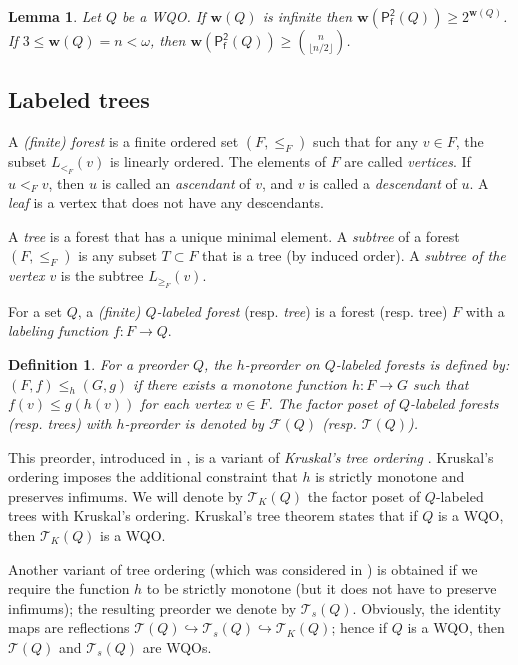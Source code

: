 \documentclass[runningheads]{llncs}
\let \leq \leqslant
\let \geq \geqslant
\let \embeds \hookrightarrow
\renewcommand \S [1][]{\mathsf{P_f^{#1}}}
\def \T {\mathcal{T}}
\def \F {\mathcal{F}}
\def \w {\textbf{w}}
\newtheorem{lemma}{Lemma}
\newtheorem{definition}{Definition}
\begin{document}
\begin{lemma}\label{w(S2)}
    Let $Q$ be a WQO. If $\w(Q)$ is infinite then $\w(\S[2](Q)) \geq 2^{\w(Q)}$. If $3 \leq \w(Q) = n < \omega$, then $\w(\S[2](Q)) \geq \binom{n}{\lfloor n/2 \rfloor}$.
\end{lemma}

\subsection{Labeled trees}\label{trees}

A \textit{(finite) forest} is a finite ordered set $(F, \leq_F)$ such that for any $v \in F$, the subset $L_{<_F}(v)$ is linearly ordered. The elements of $F$ are called \textit{vertices}. If $u <_F v$, then $u$ is called an \textit{ascendant} of $v$, and $v$ is called a \textit{descendant} of $u$. A \textit{leaf} is a vertex that does not have any descendants.

A \textit{tree} is a forest that has a unique minimal element. A \textit{subtree} of a forest $(F, \leq_F)$ is any subset $T \subset F$ that is a tree (by induced order). A \textit{subtree of the vertex $v$} is the subtree $L_{\geq_F}(v)$.

For a set $Q$, a \textit{(finite) $Q$-labeled forest} (resp. \textit{tree}) is a forest (resp. tree) $F$ with a \textit{labeling function} $f \colon F \to Q$.

\begin{definition}
    For a preorder $Q$, the $h$-preorder on $Q$-labeled forests is defined by: $(F, f) \leq_h (G, g)$ if there exists a monotone function $h \colon F \to G$ such that $f(v) \leq g(h(v))$ for each vertex $v \in F$. The factor poset of $Q$-labeled forests (resp. trees) with $h$-preorder is denoted by $\F(Q)$ (resp. $\T(Q)$).
\end{definition}

This preorder, introduced in \cite{Selivanov2011}, is a variant of \textit{Kruskal's tree ordering} \cite{Kruskal1960}. Kruskal's ordering imposes the additional constraint that $h$ is strictly monotone and preserves infimums. We will denote by $\T_K(Q)$ the factor poset of $Q$-labeled trees with Kruskal's ordering. Kruskal's tree theorem states that if $Q$ is a WQO, then $\T_K(Q)$ is a WQO.

Another variant of tree ordering (which was considered in \cite{Montalban2017,Friedman2023}) is obtained if we require the function $h$ to be strictly monotone (but it does not have to preserve infimums); the resulting preorder we denote by $\T_s(Q)$. Obviously, the identity maps are reflections $\T(Q) \embeds \T_s(Q) \embeds \T_K(Q)$; hence if $Q$ is a WQO, then $\T(Q)$ and $\T_s(Q)$ are WQOs.
\end{document}
